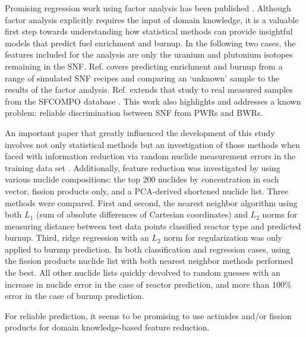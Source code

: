 Promising regression work using factor analysis has been published
\cite{nicolaou_2006, nicolaou_2014}.  Although factor analysis explicitly
requires the input of domain knowledge, it is a valuable first step towards
understanding how statistical methods can provide insightful models that
predict fuel enrichment and burnup. In the following two cases, the features
included for the analysis are only the uranium and plutonium isotopes remaining
in the \gls{SNF}.  Ref. \cite{nicolaou_2006} covers predicting enrichment and
burnup from a range of simulated \gls{SNF} recipes and comparing an `unknown'
sample to the results of the factor analysis. Ref.  \cite{nicolaou_2014}
extends that study to real measured samples from the \gls{SFCOMPO} database
\cite{sfcompo}. This work also highlights and addresses a known problem:
reliable discrimination between \gls{SNF} from \glspl{PWR} and 
\glspl{BWR}. 

An important paper that greatly influenced the development of this study
involves not only statistical methods but an investigation of those methods
when faced with information reduction via random nuclide measurement errors in
the training data set \cite{dayman_feasibility_2013}.  Additionally, feature
reduction was investigated by using various nuclide compositions: the top 200
nuclides by concentration in each vector, fission products only, and a
\gls{PCA}-derived shortened nuclide list.  Three methods were compared. First
and second, the nearest neighbor algorithm using both $L_1$ (sum of absolute
differences of Cartesian coordinates) and $L_2$ norms for measuring distance
between test data points classified reactor type and predicted burnup.  Third,
ridge regression with an $L_2$ norm for regularization was only applied to
burnup prediction. In both classification and regression cases, using the
fission products nuclide list with both nearest neighbor methods performed the
best. All other nuclide lists quickly devolved to random guesses with an
increase in nuclide error in the case of reactor prediction, and more than
100\% error in the case of burnup prediction.

For reliable prediction, it seems to be promising to use actinides
\cite{nicolaou_2006, nicolaou_2014} and/or fission products
\cite{dayman_feasibility_2013} for domain knowledge-based feature reduction.
